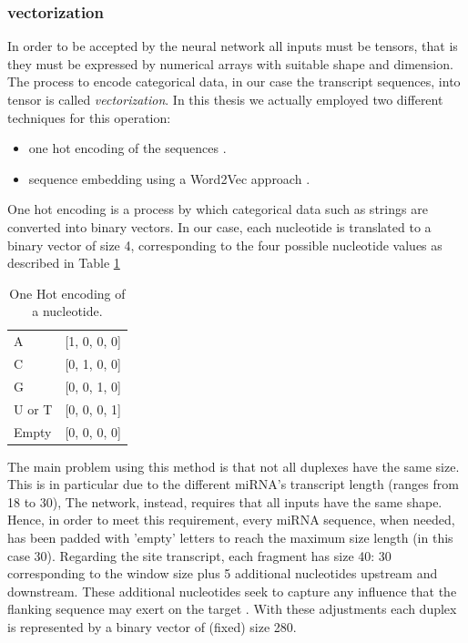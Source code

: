 \subsubsection{vectorization}
In order to be accepted by the neural network all inputs must be tensors, that is they must be expressed by numerical arrays with suitable shape and dimension. The process to encode categorical data, in our case the transcript sequences, into tensor is called \emph{vectorization}. In this thesis we actually employed two different techniques for this operation: 

\begin{itemize} 
	\item one hot encoding of the sequences \cite{onehotencode}. 
	\item sequence embedding using a Word2Vec approach \cite{word2vec}. 
\end{itemize}

One hot encoding is a process by which categorical data such as strings are converted into binary vectors. In our case, each nucleotide is translated to a binary vector of size 4, corresponding to the four possible nucleotide values as described in Table \ref{tab:ohe} 

\begin{table}[!b]
	\caption{One Hot encoding of a nucleotide.}
	\label{tab:ohe}
	\centering
	\begin{tabular}{l l}
		\toprule
		\tabhead{Nucleotide} & \tabhead{Encoding} \\
		\midrule
		A & [1, 0, 0, 0]\\
		C & [0, 1, 0, 0]\\
		G & [0, 0, 1, 0]\\
		U or T & [0, 0, 0, 1]\\
		Empty & [0, 0, 0, 0]\\
		\bottomrule
	\end{tabular}
\end{table}

The main problem using this method is that not all duplexes have the same size. This is in particular due to the different miRNA's transcript length (ranges from 18 to 30), The network, instead, requires that all inputs have the same shape. Hence, in order to meet this requirement, every miRNA sequence, when needed, has been padded with 'empty' letters to reach the maximum size length (in this case 30). Regarding the site transcript, each fragment has size 40: 30 corresponding to the window size plus 5 additional nucleotides upstream and downstream. These additional nucleotides seek to capture any influence that the flanking sequence may exert on the target \cite{conserved_pairing}. With these adjustments each duplex is represented by a binary vector of (fixed) size 280.

